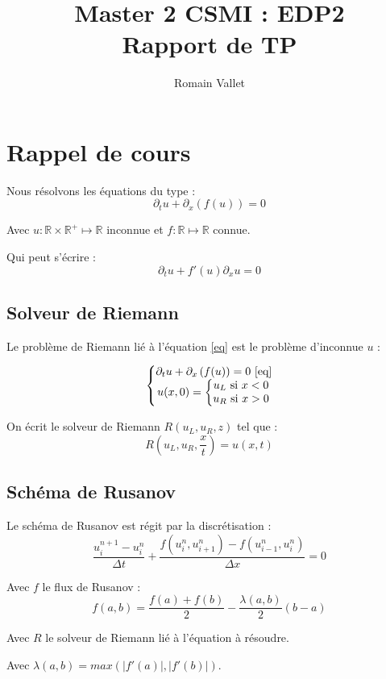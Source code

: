 \documentclass{article}
\title{Master 2 CSMI : EDP2\\Rapport de TP}
\author{Romain Vallet}
\begin{document}
\maketitle

\section{Rappel de cours}

Nous résolvons les équations du type :
\[ \partial_t u + \partial_x \left(f(u)\right) = 0 \label{eq} \tag{EQ} \]

Avec $u : \mathbb{R} \times \mathbb{R}^{+} \mapsto \mathbb{R}$ inconnue et $f : \mathbb{R} \mapsto \mathbb{R}$ connue.

Qui peut s'écrire :
\[ \partial_t u + f'(u) \partial_x u = 0 \label{eq2} \tag{EQ2} \]

\subsection{Solveur de Riemann}

Le problème de Riemann lié à l'équation \ref{eq} est le problème d'inconnue $u$ :

\[ \left\{ \begin{matrix}
	\partial_t u + \partial_x \left(f(u)\right) = 0 \text{   }\ref{eq} \\
	u(x,0) = \left\{ \begin{matrix}
				u_L \text{ si } x < 0 \\
				u_R \text{ si } x > 0
	\end{matrix} \right.
\end{matrix} \right.\]

On écrit le solveur de Riemann $R(u_L, u_R, z)$ tel que :
\[ R(u_L, u_R, \frac{x}{t}) = u(x,t) \]

\subsection{Schéma de Rusanov}

Le schéma de Rusanov est régit par la discrétisation :
\[ \frac{u_i^{n+1}-u_i^n}{\Delta t} + \frac{f(u_i^n,u_{i+1}^n) - f(u_{i-1}^n,u_i^n)}{\Delta x} = 0 \]

Avec $f$ le flux de Rusanov :
\[f(a,b) = \frac{f(a)+f(b)}{2} - \frac{\lambda(a,b)}{2} (b-a)\]

Avec $R$ le solveur de Riemann lié à l'équation à résoudre.

Avec $\lambda(a,b) = max \left(|f'(a)|, |f'(b)|\right)$.
\end{document}
